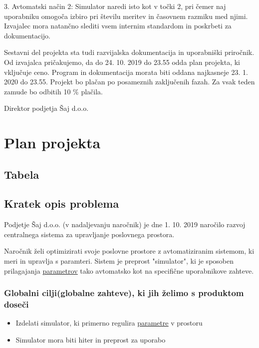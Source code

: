 \documentclass[a4paper,12pt]{article}
\begin{document}
	3. Avtomatski način 2: Simulator naredi isto kot v točki 2, pri čemer 
	naj uporabniku omogoča izbiro pri številu meritev in časovnem razmiku med njimi. 
	Izvajalec mora natančno slediti vsem internim standardom in poskrbeti za dokumentacijo. 
	
	Sestavni del projekta sta tudi razvijalska dokumentacija in uporabniški priročnik. 
	Od izvajalca pričakujemo, da do 24. 10. 2019 do 23.55 odda plan projekta, ki vključuje ceno. 
	Program in dokumentacija morata biti oddana najkasneje 23. 1. 2020 do 23.55. 
	Projekt bo plačan po posameznih zaključenih fazah. Za vsak teden zamude bo odbitih 10 \% plačila. 
	\\
	

	\hfill Direktor podjetja Šaj d.o.o.	

\newpage

\section{Plan projekta}

	\subsection{Tabela}

	\subsection{Kratek opis problema}

		\hspace{1em} Podjetje Šaj d.o.o. (v nadaljevanju naročnik) je dne 1. 10. 2019 naročilo 
		razvoj centralnega sistema za upravljanje poslovnega prostora.
		
		Naročnik želi optimizirati svoje poslovne prostore z avtomatiziranim sistemom, 
		ki meri in upravlja s paramteri. Sistem je preprost "simulator", ki je sposoben 
		prilagajanja \hyperlink{subsection.1.8}{\ul{parametrov}} tako avtomatsko kot na specifične uporabnikove zahteve.
		\subsubsection{Globalni cilji(globalne zahteve), ki jih želimo s produktom doseči}

		\begin{itemize}
				\item Izdelati simulator, ki primerno regulira {\hyperlink{subsection.1.8}{\ul{parametre}}} v prostoru
			\item Simulator mora biti hiter in preprost za uporabo
		\end{itemize}
\end{document}
